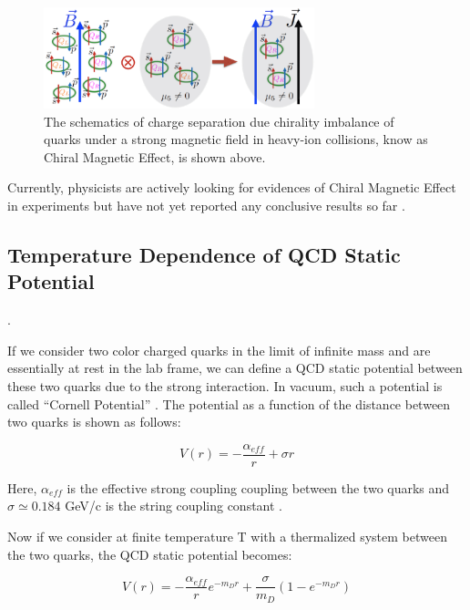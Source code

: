 \begin{figure}[hbtp]
\begin{center}
\includegraphics[width=0.70\textwidth]{Figures/Chapter1/ChiralScheme.png}
\caption{The schematics of charge separation due chirality imbalance of quarks under a strong magnetic field in heavy-ion collisions, know as Chiral Magnetic Effect, is shown above.}
\label{ChiralScheme}
\end{center}
\end{figure} 


Currently, physicists are actively looking for evidences of Chiral Magnetic Effect in experiments but have not yet reported any conclusive results so far \cite{CMEExpResult}. 


\subsection{Temperature Dependence of QCD Static Potential}. 

If we consider two color charged quarks in the limit of infinite mass and are essentially at rest in the lab frame, we can define a QCD static potential between these two quarks due to the strong interaction. In vacuum, such a potential is called ``Cornell Potential'' \cite{Cornell}. The potential as a function of the distance between two quarks is shown as follows:

\begin{equation}
V(r) = -\frac{\alpha_{eff}}{r} + \sigma r
\end{equation}

Here, $\alpha_{eff}$ is the effective strong coupling coupling between the two quarks and $\sigma \simeq 0.184$ GeV/c is the string coupling constant \cite{CornellEquation}. 

Now if we consider at finite temperature T with a thermalized system  between the two quarks, the QCD static potential becomes: 

\begin{equation}
V(r) = -\frac{\alpha_{eff}}{r} e^{-m_D r} + \frac{\sigma}{m_D} (1 - e^{-m_D r})
\end{equation}

